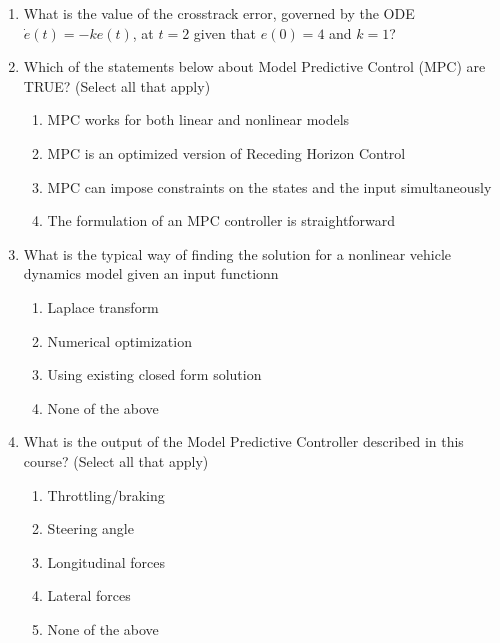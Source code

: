 \begin{enumerate}
\item What is the value of the crosstrack error, governed by the ODE 
$\dot{e}(t)=−ke(t)$, at $t=2$ given that $e(0)=4$ and $k=1$?
	
\item Which of the statements below about Model Predictive Control (MPC) are TRUE? (Select all that apply)
\begin{enumerate}
		\item    MPC works for both linear and nonlinear models
		\item MPC is an optimized version of Receding Horizon Control
		\item MPC can impose constraints on the states and the input simultaneously
		\item The formulation of an MPC controller is straightforward 
	\end{enumerate}
\item What is the typical way of finding the solution for a nonlinear vehicle dynamics model given an input functionn
\begin{enumerate}
		\item  Laplace transform
		\item Numerical optimization
		\item Using existing closed form solution
		\item None of the above 
	\end{enumerate}
\item What is the output of the Model Predictive Controller described in this course? (Select all that apply) 
\begin{enumerate}
		\item Throttling/braking
		\item Steering angle
		\item Longitudinal forces
		\item Lateral forces
		\item None of the above
	\end{enumerate}

\end{enumerate}


